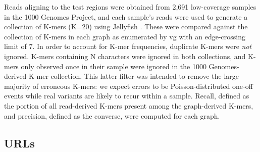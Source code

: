 Reads aligning to the test regions were obtained from 2,691 low-coverage
samples in the 1000 Genomes Project, and each sample's reads were used
to generate a collection of K-mers (K=20) using Jellyfish
\cite{Marcais2011-ck,1000_Genomes_Project_Consortium2015-mp}. These were
compared against the collection of K-mers in each graph as enumerated by
vg with an edge-crossing limit of 7. In order to account for K-mer
frequencies, duplicate K-mers were \emph{not} ignored. K-mers containing
N characters were ignored in both collections, and K-mers only observed
once in their sample were ignored in the 1000 Genomes-derived K-mer
collection. This latter filter was intended to remove the large majority
of erroneous K-mers: we expect errors to be Poisson-distributed one-off
events while real variants are likely to recur within a sample. Recall,
defined as the portion of all read-derived K-mers present among the
graph-derived K-mers, and precision, defined as the converse, were
computed for each graph.

\subsection{URLs}

